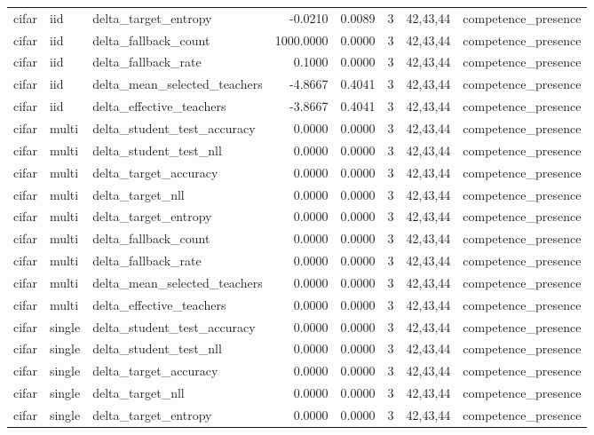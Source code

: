 \begin{tabular}{lllrrrll}
cifar & iid & delta\_target\_entropy & -0.0210 & 0.0089 & 3 & 42,43,44 & competence\_presence \\
cifar & iid & delta\_fallback\_count & 1000.0000 & 0.0000 & 3 & 42,43,44 & competence\_presence \\
cifar & iid & delta\_fallback\_rate & 0.1000 & 0.0000 & 3 & 42,43,44 & competence\_presence \\
cifar & iid & delta\_mean\_selected\_teachers & -4.8667 & 0.4041 & 3 & 42,43,44 & competence\_presence \\
cifar & iid & delta\_effective\_teachers & -3.8667 & 0.4041 & 3 & 42,43,44 & competence\_presence \\
cifar & multi & delta\_student\_test\_accuracy & 0.0000 & 0.0000 & 3 & 42,43,44 & competence\_presence \\
cifar & multi & delta\_student\_test\_nll & 0.0000 & 0.0000 & 3 & 42,43,44 & competence\_presence \\
cifar & multi & delta\_target\_accuracy & 0.0000 & 0.0000 & 3 & 42,43,44 & competence\_presence \\
cifar & multi & delta\_target\_nll & 0.0000 & 0.0000 & 3 & 42,43,44 & competence\_presence \\
cifar & multi & delta\_target\_entropy & 0.0000 & 0.0000 & 3 & 42,43,44 & competence\_presence \\
cifar & multi & delta\_fallback\_count & 0.0000 & 0.0000 & 3 & 42,43,44 & competence\_presence \\
cifar & multi & delta\_fallback\_rate & 0.0000 & 0.0000 & 3 & 42,43,44 & competence\_presence \\
cifar & multi & delta\_mean\_selected\_teachers & 0.0000 & 0.0000 & 3 & 42,43,44 & competence\_presence \\
cifar & multi & delta\_effective\_teachers & 0.0000 & 0.0000 & 3 & 42,43,44 & competence\_presence \\
cifar & single & delta\_student\_test\_accuracy & 0.0000 & 0.0000 & 3 & 42,43,44 & competence\_presence \\
cifar & single & delta\_student\_test\_nll & 0.0000 & 0.0000 & 3 & 42,43,44 & competence\_presence \\
cifar & single & delta\_target\_accuracy & 0.0000 & 0.0000 & 3 & 42,43,44 & competence\_presence \\
cifar & single & delta\_target\_nll & 0.0000 & 0.0000 & 3 & 42,43,44 & competence\_presence \\
cifar & single & delta\_target\_entropy & 0.0000 & 0.0000 & 3 & 42,43,44 & competence\_presence \\

\end{tabular}
